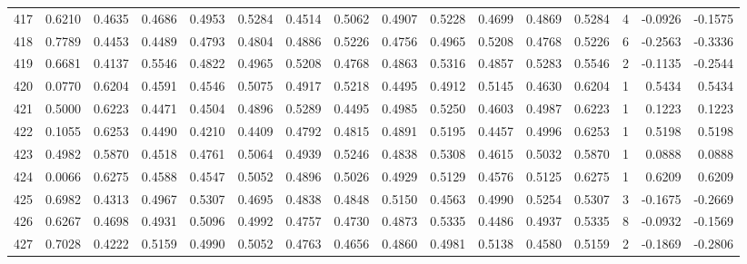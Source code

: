 \begin{tabular}{lrrrrrrrrrrrrrrr}
417 &      0.6210 &  0.4635 &  0.4686 &  0.4953 &  0.5284 &  0.4514 &  0.5062 &  0.4907 &  0.5228 &  0.4699 &   0.4869 &     0.5284 &      4 &                   -0.0926 &                    -0.1575 \\
418 &      0.7789 &  0.4453 &  0.4489 &  0.4793 &  0.4804 &  0.4886 &  0.5226 &  0.4756 &  0.4965 &  0.5208 &   0.4768 &     0.5226 &      6 &                   -0.2563 &                    -0.3336 \\
419 &      0.6681 &  0.4137 &  0.5546 &  0.4822 &  0.4965 &  0.5208 &  0.4768 &  0.4863 &  0.5316 &  0.4857 &   0.5283 &     0.5546 &      2 &                   -0.1135 &                    -0.2544 \\
420 &      0.0770 &  0.6204 &  0.4591 &  0.4546 &  0.5075 &  0.4917 &  0.5218 &  0.4495 &  0.4912 &  0.5145 &   0.4630 &     0.6204 &      1 &                    0.5434 &                     0.5434 \\
421 &      0.5000 &  0.6223 &  0.4471 &  0.4504 &  0.4896 &  0.5289 &  0.4495 &  0.4985 &  0.5250 &  0.4603 &   0.4987 &     0.6223 &      1 &                    0.1223 &                     0.1223 \\
422 &      0.1055 &  0.6253 &  0.4490 &  0.4210 &  0.4409 &  0.4792 &  0.4815 &  0.4891 &  0.5195 &  0.4457 &   0.4996 &     0.6253 &      1 &                    0.5198 &                     0.5198 \\
423 &      0.4982 &  0.5870 &  0.4518 &  0.4761 &  0.5064 &  0.4939 &  0.5246 &  0.4838 &  0.5308 &  0.4615 &   0.5032 &     0.5870 &      1 &                    0.0888 &                     0.0888 \\
424 &      0.0066 &  0.6275 &  0.4588 &  0.4547 &  0.5052 &  0.4896 &  0.5026 &  0.4929 &  0.5129 &  0.4576 &   0.5125 &     0.6275 &      1 &                    0.6209 &                     0.6209 \\
425 &      0.6982 &  0.4313 &  0.4967 &  0.5307 &  0.4695 &  0.4838 &  0.4848 &  0.5150 &  0.4563 &  0.4990 &   0.5254 &     0.5307 &      3 &                   -0.1675 &                    -0.2669 \\
426 &      0.6267 &  0.4698 &  0.4931 &  0.5096 &  0.4992 &  0.4757 &  0.4730 &  0.4873 &  0.5335 &  0.4486 &   0.4937 &     0.5335 &      8 &                   -0.0932 &                    -0.1569 \\
427 &      0.7028 &  0.4222 &  0.5159 &  0.4990 &  0.5052 &  0.4763 &  0.4656 &  0.4860 &  0.4981 &  0.5138 &   0.4580 &     0.5159 &      2 &                   -0.1869 &                    -0.2806 \\

\end{tabular}

